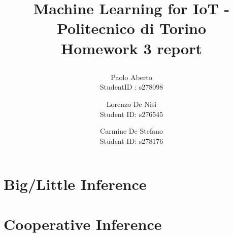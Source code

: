 \documentclass{article}
\date{}
\begin{document}
\author{Paolo Aberto\\
StudentID : s278098\\

\and
Lorenzo De Nisi\\
Student ID: s276545\\

\and
Carmine De Stefano\\
Student ID: s278176\\
}

\justifying

\title{
    \vspace{0.8cm}
    
    Machine Learning for IoT - 
    Politecnico di Torino\\
    \vspace{.5cm}
    \Large \textbf{Homework 3 report}
    \vspace{.1cm}
}

\maketitle
\thispagestyle{empty} 
\vspace{-0.9cm}


\section{Big/Little Inference}






\section{Cooperative Inference}





\end{document}
